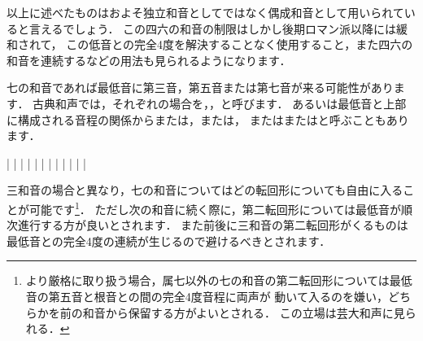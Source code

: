 \documentclass[dvipdfmx,uplatex,b5paper,openany,jbase=12Q,nomag*,textwidth-limit=44%
               ]{gachimuchi}
\begin{document}
\begin{Yodan}
以上に述べたものはおよそ独立和音としてではなく偶成和音として用いられていると言えるでしょう．
この四六の和音の制限はしかし後期ロマン派以降には緩和されて，
この低音との完全4度を解決することなく使用すること，また四六の和音を連続するなどの用法も見られるようになります．


\end{Yodan}

七の和音であれば最低音に第三音，第五音または第七音が来る可能性があります．
古典和声では，それぞれの場合を，，と呼びます．
あるいは最低音と上部に構成される音程の関係からまたは，または，
またはまたはと呼ぶこともあります．

\begin{Music}[0.6\linewidth]
  \Startpiece
  \znotes|\en%
  \NOTEs%
  |%
  \en%
  \NOTes|\sk\en%
  \NOTes|\sk\en%
  \xbar%
  \znotes|\en%
  \NOTEs%
  |%
  \en%
  \NOTes|\sk\en%
  \NOTes|\sk\en%
  \xbar%
  \znotes|\en%
  \NOTEs%
  |%
  \en%
  \NOTes|\sk\en%
  \NOTes|\sk\en%
  \endpiece
\end{Music}
\begin{Yodan}
三和音の場合と異なり，七の和音についてはどの転回形についても自由に入ることが可能です\footnote{%
  より厳格に取り扱う場合，属七以外の七の和音の第二転回形については最低音の第五音と根音との間の完全4度音程に両声が
  動いて入るのを嫌い，どちらかを前の和音から保留する方がよいとされる．
  この立場は芸大和声\cite{chSHIMAOKA1i,chSHIMAOKA1ii,chSHIMAOKA1iii}に見られる．
}．
ただし次の和音に続く際に，第二転回形については最低音が順次進行する方が良いとされます．
また前後に三和音の第二転回形がくるものは最低音との完全4度の連続が生じるので避けるべきとされます．
\end{Yodan}
\end{document}
